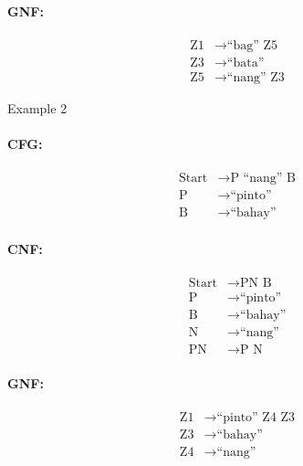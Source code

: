 \paragraph{GNF:}
\begin{equation*}
    \begin{aligned}
        \text{Z1}   & \rightarrow \text{“bag” Z5}   \\
        \text{Z3} & \rightarrow \text{“bata”} \\
        \text{Z5} & \rightarrow \text{“nang” Z3}
    \end{aligned}
\end{equation*}

Example 2
\paragraph{CFG:}
\begin{equation*}
    \begin{aligned}
        \text{Start}   & \rightarrow \text{P “nang” B}   \\
        \text{P} & \rightarrow \text{“pinto”} \\
        \text{B} & \rightarrow \text{“bahay”}
    \end{aligned}
\end{equation*}

\paragraph{CNF:}
\begin{equation*}
    \begin{aligned}
        \text{Start}   & \rightarrow \text{PN B}   \\
        \text{P} & \rightarrow \text{“pinto”} \\
        \text{B} & \rightarrow \text{“bahay”} \\
        \text{N} & \rightarrow \text{“nang”} \\
        \text{PN} & \rightarrow \text{P N}
    \end{aligned}
\end{equation*}

\paragraph{GNF:}
\begin{equation*}
    \begin{aligned}
        \text{Z1}   & \rightarrow \text{“pinto” Z4 Z3}   \\
        \text{Z3} & \rightarrow \text{“bahay”} \\
        \text{Z4} & \rightarrow \text{“nang”}
    \end{aligned}
\end{equation*}

